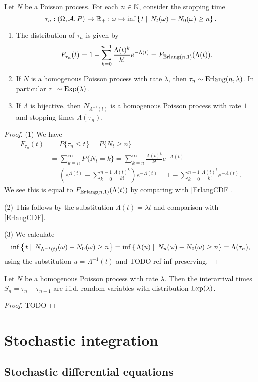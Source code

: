 \begin{proposition}
Let $N$ be a Poisson process. For each $n\in \mathbb{N}$, consider the stopping time
\[ \tau_n: \left( \Omega, \mathcal{A}, P \right) \to \mathbb{R}_+: \omega \mapsto \inf\left\{\left. t \;\right|\; N_t(\omega) - N_0(\omega) \geq n  \right\}. \]
\begin{enumerate}
\item The distribution of $\tau_n$ is given by
\[ F_{\tau_n}(t) = 1- \sum_{k=0}^{n-1}\frac{\Lambda(t)^k}{k!}e^{-\Lambda(t)} = F_{\operatorname{Erlang}(n, 1)}(\Lambda(t)). \]
\item If $N$ is a homogenous Poisson process with rate $\lambda$, then $\tau_n \sim \operatorname{Erlang}(n, \lambda)$. In particular $\tau_1 \sim \operatorname{Exp}(\lambda)$.
\item If $\Lambda$ is bijective, then $N_{\Lambda^{-1}(t)}$ is a homogenous Poisson process with rate $1$ and stopping times $\Lambda(\tau_n)$.
\end{enumerate}
\end{proposition}
\begin{proof}
(1) We have
\begin{align*}
F_{\tau_n}(t) &= P\{\tau_n \leq t\} = P\{N_t \geq n\} \\
&= \sum_{k=n}^{\infty}P\{N_t = k\} = \sum_{k=n}^{\infty} \frac{\Lambda(t)^k}{k!}e^{-\Lambda(t)} \\
&= (e^{\Lambda(t)} - \sum_{k=0}^{n-1}\frac{\Lambda(t)^k}{k!})e^{-\Lambda(t)} = 1- \sum_{k=0}^{n-1}\frac{\Lambda(t)^k}{k!}e^{-\Lambda(t)}.
\end{align*}
We see this is equal to $F_{\operatorname{Erlang}(n, 1)}(\Lambda(t))$ by comparing with \ref{ErlangCDF}. 

(2) This follows by the substitution $\Lambda(t) = \lambda t$ and comparison with \ref{ErlangCDF}.

(3) We calculate
\[ \inf\left\{\left. t \;\right|\; N_{\Lambda^{-1}(t)}(\omega) - N_0(\omega) \geq n  \right\} = \inf\left\{\left. \Lambda(u) \;\right|\; N_{u}(\omega) - N_0(\omega) \geq n  \right\} = \Lambda(\tau_n), \]
using the substitution $u = \Lambda^{-1}(t)$ and TODO ref inf preserving.
\end{proof}

\begin{proposition}
Let $N$ be a homogenous Poisson process with rate $\lambda$. Then the interarrival times $S_n = \tau_n - \tau_{n-1}$ are i.i.d. random variables with distribution $\operatorname{Exp}(\lambda)$.
\end{proposition}
\begin{proof}
TODO
\end{proof}

\section{Stochastic integration}
\subsection{Stochastic differential equations}

